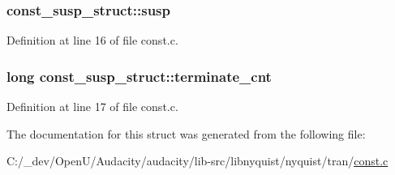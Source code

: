 \subsubsection[{\texorpdfstring{susp}{susp}}]{ const\+\_\+susp\+\_\+struct\+::susp}\hypertarget{structconst__susp__struct_a4d595465eca86633363ea353041cdf41}{}\label{structconst__susp__struct_a4d595465eca86633363ea353041cdf41}


Definition at line 16 of file const.\+c.

\subsubsection[{\texorpdfstring{terminate\+\_\+cnt}{terminate_cnt}}]{\setlength{\rightskip}{0pt plus 5cm}long const\+\_\+susp\+\_\+struct\+::terminate\+\_\+cnt}\hypertarget{structconst__susp__struct_a7a0a7148d1d2c8d5e0c67f502ed510ef}{}\label{structconst__susp__struct_a7a0a7148d1d2c8d5e0c67f502ed510ef}


Definition at line 17 of file const.\+c.



The documentation for this struct was generated from the following file\+:\begin{DoxyCompactItemize}
\item 
C\+:/\+\_\+dev/\+Open\+U/\+Audacity/audacity/lib-\/src/libnyquist/nyquist/tran/\hyperlink{const_8c}{const.\+c}\end{DoxyCompactItemize}
